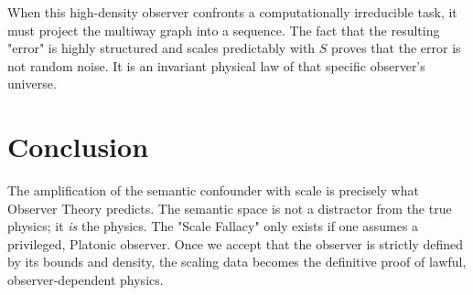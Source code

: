\documentclass[12pt,a4paper]{article}
\begin{document}
When this high-density observer confronts a computationally irreducible task, it must project the multiway graph into a sequence. The fact that the resulting "error" is highly structured and scales predictably with $S$ proves that the error is not random noise. It is an invariant physical law of that specific observer's universe.

\section{Conclusion}

The amplification of the semantic confounder with scale is precisely what Observer Theory predicts. The semantic space is not a distractor from the true physics; it \emph{is} the physics. The "Scale Fallacy" only exists if one assumes a privileged, Platonic observer. Once we accept that the observer is strictly defined by its bounds and density, the scaling data becomes the definitive proof of lawful, observer-dependent physics.
\end{document}

